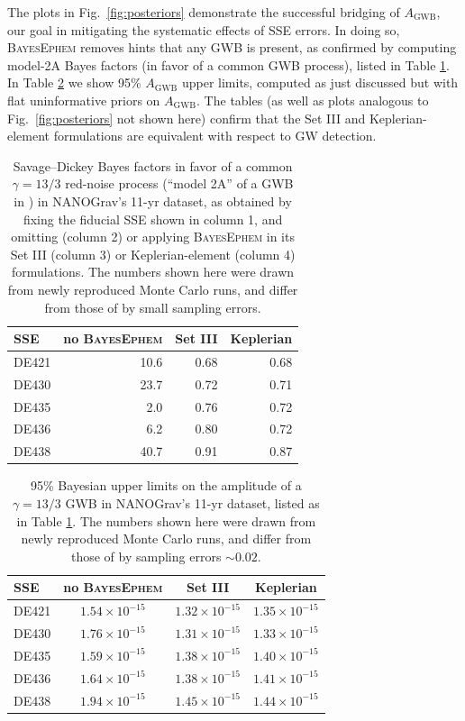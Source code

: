 \documentclass[iop,apj,twocolappendix]{emulateapj}
\begin{document}
The plots in Fig.\ \ref{fig:posteriors} demonstrate the successful bridging of $A_\mathrm{GWB}$, our goal in mitigating the systematic effects of SSE errors. In doing so, \textsc{BayesEphem} removes hints that any GWB is present, as confirmed by computing model-2A Bayes factors (in favor of a common GWB process), listed in Table \ref{tab:bf}. In Table \ref{tab:upper} we show 95\% $A_\mathrm{GWB}$ upper limits, computed as just discussed but with flat uninformative priors on $A_\mathrm{GWB}$. The tables (as well as plots analogous to Fig.\ \ref{fig:posteriors} not shown here) confirm that the Set III and Keplerian-element formulations are equivalent with respect to GW detection.
%
\begin{table}[ht]
    \centering
    \begin{tabular}{l|r|r|r}
SSE & no \textsc{BayesEphem} & Set III & Keplerian \\
\hline
DE421 & 10.6 & 0.68 & 0.68 \\
DE430 & 23.7 & 0.72 & 0.71 \\
DE435 &  2.0 & 0.76 & 0.72 \\
DE436 &  6.2 & 0.80 & 0.72 \\
DE438 & 40.7 & 0.91 & 0.87
    \end{tabular}
    \caption{Savage--Dickey Bayes factors in favor of a common $\gamma=13/3$ red-noise process (``model 2A'' of a GWB in \cite{2018ApJ...859...47A}) in NANOGrav's 11-yr dataset, as obtained by fixing the fiducial SSE shown in column 1, and omitting (column 2) or applying \textsc{BayesEphem} in its Set III (column 3) or Keplerian-element (column 4) formulations. The numbers shown here were drawn from newly reproduced Monte Carlo runs, and differ from those of \cite{2018ApJ...859...47A} by small sampling errors.}
    \label{tab:bf}
\end{table}
%
\begin{table}[ht]
    \centering
    \begin{tabular}{l|c|c|c}
SSE & no \textsc{BayesEphem} & Set III & Keplerian \\
\hline
DE421 & $1.54 \times 10^{-15}$ & $1.32 \times 10^{-15}$ & $1.35 \times 10^{-15}$ \\
DE430 & $1.76 \times 10^{-15}$ & $1.31 \times 10^{-15}$ & $1.33 \times 10^{-15}$ \\
DE435 & $1.59 \times 10^{-15}$ & $1.38 \times 10^{-15}$ & $1.40 \times 10^{-15}$ \\
DE436 & $1.64 \times 10^{-15}$ & $1.38 \times 10^{-15}$ & $1.41 \times 10^{-15}$ \\
DE438 & $1.94 \times 10^{-15}$ & $1.45 \times 10^{-15}$ & $1.44 \times 10^{-15}$ \\
    \end{tabular}
    \caption{95\% Bayesian upper limits on the amplitude of a $\gamma=13/3$ GWB in NANOGrav's 11-yr dataset, listed as in Table \ref{tab:bf}. The numbers shown here were drawn from newly reproduced Monte Carlo runs, and differ from those of \cite{2018ApJ...859...47A} by sampling errors $\sim 0.02$.}
    \label{tab:upper}
\end{table}
\end{document}
